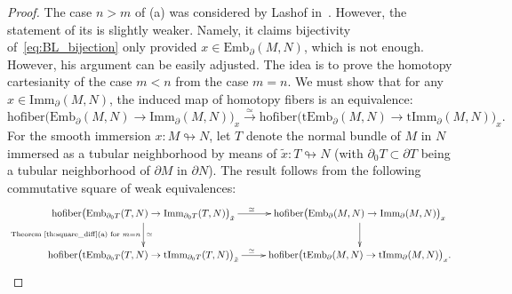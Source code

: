 \documentclass[11pt]{amsart}
\theoremstyle{definition}
\newtheorem{remark}[theorem]{Remark}
\newcommand{\Emb}{\mathrm{Emb}}
\newcommand{\Imm}{\mathrm{Imm}}
\newcommand{\tImm}{\mathrm{tImm}}
\newcommand{\tEmb}{\mathrm{tEmb}}
\newcommand{\hofiber}{\mathrm{hofiber}}
\numberwithin{equation}{section}
\begin{document}
\begin{proof}
The case $n>m$ of (a) was considered by Lashof in~\cite{Lashof}. However, the statement of its \cite[Theorem~A~$(t/d)$]{Lashof} is slightly
weaker. Namely, it claims bijectivity of~\eqref{eq:BL_bijection} only provided $x\in\Emb_{\partial}(M,N)$, which is not enough. However, his argument can be easily
adjusted. The idea is to prove the homotopy cartesianity of the case $m<n$ from the case $m=n$. We must show that for any 
$x\in \Imm_{\partial}(M,N)$, the induced map of homotopy fibers is an equivalence:
\[
\hofiber\bigl( \Emb_{\partial}(M,N)\to  \Imm_{\partial}(M,N)\bigr)_x \xrightarrow{\simeq} \hofiber\bigl( \tEmb_{\partial}(M,N) \to  \tImm_{\partial}(M,N)\bigr)_x.
\]
For the smooth immersion $x\colon M\looparrowright N$, let $T$ denote the normal bundle of $M$ in $N$ immersed as a tubular neighborhood by means of
$\tilde x\colon T\looparrowright N$ (with $\partial_0 T\subset \partial T$ being a tubular neighborhood of $\partial M$ in $\partial N$).
The result follows from the following commutative square of weak equivalences:
\[
\xymatrix{
 \hofiber\bigl( \Emb_{\partial_0 T}(T,N)\to  \Imm_{\partial_0 T}(T,N)\bigr)_{\tilde x} \ar[d]^\simeq_{\text{Theorem~\ref{th:square_diff}(a) for }m=n}\ar[r]^\simeq&
  \hofiber\bigl( \Emb_{\partial}(M,N) \to  \Imm_{\partial}(M,N)\bigr)_x  \ar[d]\\
\hofiber\bigl( \tEmb_{\partial_0 T}(T,N)\to  \tImm_{\partial_0 T}(T,N)\bigr)_{\tilde x} \ar[r]^\simeq&   
 \hofiber\bigl( \tEmb_{\partial}(M,N) \to  \tImm_{\partial}(M,N)\bigr)_x.
}
\]
\end{proof}

%
\end{document}
